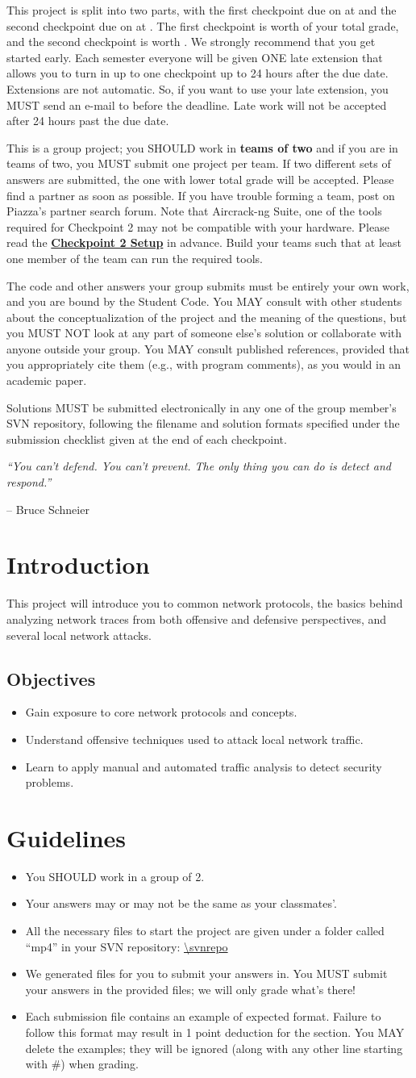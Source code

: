 \documentclass[letterpaper,12pt]{report}
\newcommand{\htitle}
{
     \noindent\parbox{\textwidth}
    {
        \course\hfill \distdate\newline
        \coursename\hfill 
        \settitle \vspace*{-.5ex}\newline
        \mbox{}\hrulefill\mbox{}
    }
    \vspace{8pt}
    \begin{center}{\Large\bf{\settitle}}\end{center}
}
\newcommand{\handout}
{
    \thispagestyle{empty}
    \markboth{}{}
    \pagestyle{plain}
    \htitle
}
\newcommand{\problemsetheader}
{
\setlength{\parindent}{0pt}

\medskip

This project is split into two parts, with the first checkpoint due on {\bf \checkpointduedate} at {\bf \duetime} and the second checkpoint due on {\bf \duedate} at {\bf \duetime}.
The first checkpoint is worth {\firstcheckpointpercent} of your total grade, and the second checkpoint is worth \secondcheckpointpercent.
We strongly recommend that you get started early.
Each semester everyone will be given ONE late extension that allows you to turn in up to one checkpoint up to 24 hours after the due date.
Extensions are not automatic.
So, if you want to use your late extension, you MUST send an e-mail to {\staffemail} before the deadline.
Late work will not be accepted after 24 hours past the due date.

\medskip

This is a group project; you SHOULD work in \textbf{teams of two} and if you are in teams of two, you MUST submit one project per team.
If two different sets of answers are submitted, the one with lower total grade will be accepted.
Please find a partner as soon as possible.
If you have trouble forming a team, post on Piazza's partner search forum.
Note that Aircrack-ng Suite, one of the tools required for Checkpoint 2 may not be compatible with your hardware.
Please read the \textbf{\hyperlink{cp2setup}{Checkpoint 2 Setup}} in advance. Build your teams such that at least one member of the team can run the required tools.

\medskip

The code and other answers your group submits must be entirely your own work, and you are bound by the Student Code.
You MAY consult with other students about the conceptualization of the project and the meaning of the questions, but you MUST NOT look at any part of someone else's solution or collaborate with anyone outside your group.
You MAY consult published references, provided that you appropriately cite them (e.g., with program comments), as you would in an academic paper.

\medskip

Solutions MUST be submitted electronically in any one of the group member's SVN repository, following the filename and solution formats specified under the submission checklist given at the end of each checkpoint.

\medskip

\hrulefill

\medskip
}
\begin{document}
\handout
\problemsetheader
\medskip
\noindent
\emph{``You can't defend. You can't prevent. The only thing you can do is detect and respond.''}

\begingroup\raggedleft
-- Bruce Schneier\\
\endgroup

\newpage

\section*{Introduction}

This project will introduce you to common network protocols, the basics behind analyzing network traces from both offensive and defensive perspectives, and several local network attacks.

\vspace{-6pt}
\subsection*{Objectives}
\begin{itemize}
\item Gain exposure to core network protocols and concepts.
\item Understand offensive techniques used to attack local network traffic.
\item Learn to apply manual and automated traffic analysis to detect security problems.
\end{itemize}

\section*{Guidelines}
\begin{itemize}
\item You SHOULD work in a group of 2.
\item Your answers may or may not be the same as your classmates'.
\item All the necessary files to start the project are given under a folder called ``mp4'' in your SVN repository: \url{\svnrepo}
\item We generated files for you to submit your answers in.
You MUST submit your answers in the provided files; we will only grade what's there!
\item Each submission file contains an example of expected format. Failure to follow this format may result in 1 point deduction for the section. You MAY delete the examples; they will be ignored (along with any other line starting with \#) when grading.
\end{itemize}
\end{document}
